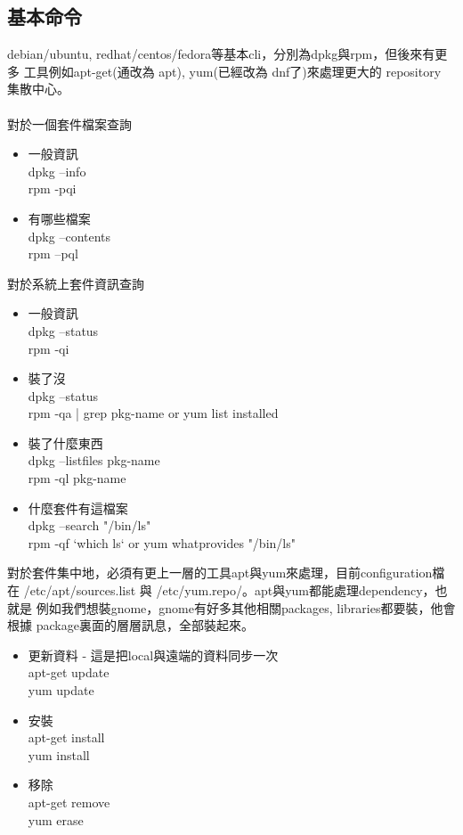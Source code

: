   \subsection{基本命令}
  debian/ubuntu, redhat/centos/fedora等基本cli，分別為dpkg與rpm，但後來有更多
  工具例如apt-get(通改為 apt), yum(已經改為 dnf了)來處理更大的 repository
  集散中心。
  \\\\
  對於一個套件檔案查詢
  \begin{itemize}
    \item 一般資訊\\
      dpkg --info\\
      rpm -pqi 
    \item 有哪些檔案\\
      dpkg --contents\\
      rpm --pql 
  \end{itemize}
  對於系統上套件資訊查詢
  \begin{itemize}
    \item 一般資訊\\
      dpkg --status \\
      rpm -qi
    \item 裝了沒\\
      dpkg --status\\
      rpm -qa | grep pkg-name  or yum list installed\\
    \item 裝了什麼東西\\
      dpkg --listfiles pkg-name\\
      rpm -ql pkg-name
    \item 什麼套件有這檔案\\
      dpkg --search "/bin/ls"\\
      rpm -qf `which ls` or yum whatprovides "/bin/ls"
  \end{itemize}
  對於套件集中地，必須有更上一層的工具apt與yum來處理，目前configuration檔在
  /etc/apt/sources.list 與 /etc/yum.repo/。apt與yum都能處理dependency，也就是
  例如我們想裝gnome，gnome有好多其他相關packages, libraries都要裝，他會根據
  package裏面的層層訊息，全部裝起來。
  \begin{itemize}
    \item 更新資料 - 這是把local與遠端的資料同步一次\\
      apt-get update\\
      yum update
    \item 安裝\\
      apt-get install\\
      yum install
    \item 移除\\
      apt-get remove\\
      yum erase
  \end{itemize}
